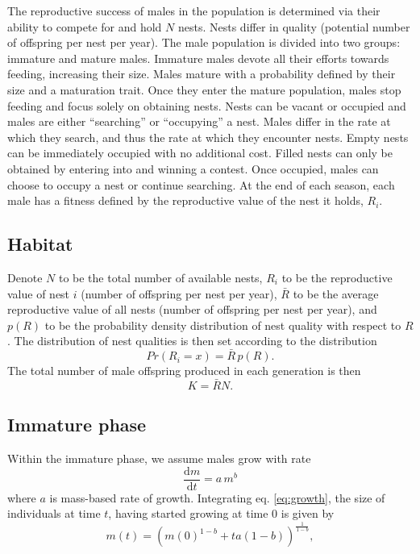 \documentclass[a4paper,11pt]{article}
\begin{document}
The reproductive success of males in the population is determined via their ability to compete for and hold $N$ nests. Nests differ in quality (potential number of offspring per nest per year). The male population is divided into two groups: immature and mature males. Immature males devote all their efforts towards feeding, increasing their size. Males mature with a probability defined by their size and a maturation trait. Once they enter the mature population, males stop feeding and focus solely on obtaining nests. Nests can be vacant or occupied and males are either ``searching'' or ``occupying'' a nest. Males differ in the rate at which they search, and thus the rate at which they encounter nests. Empty nests can be immediately occupied with no additional cost. Filled nests can only be obtained by entering into and winning a contest. Once occupied, males can choose to occupy a nest or continue searching. At the end of each season, each male has a fitness defined by the reproductive value of the nest it holds, $R_i$.

\subsection{Habitat}

Denote $N$ to be the total number of available nests, $R_i$ to be the reproductive value of nest $i$ (number of offspring per nest per year), $\bar{R}$ to be the average reproductive value of all nests (number of offspring per nest per year), and $p(R)$ to be the probability density distribution of nest quality with respect to $R$. The distribution of nest qualities is then set according to the distribution
\begin{equation} \label{eq:pdf_R}
    Pr(R_i = x) =\bar{R} \, p(R).
\end{equation}
The total number of male offspring produced in each generation is then
\begin{equation} \label{eq:pdf_R}
    K = \bar{R} N.
\end{equation}

\subsection{Immature phase}

Within the immature phase, we assume males grow with rate
\begin{equation} \label{eq:growth}
\frac{{\mathrm d} m}{{\mathrm d} t} = a \, m^ b
\end{equation}
where $a$ is mass-based rate of growth. Integrating eq. \ref{eq:growth}, the size of individuals at time $t$, having started growing at time $0$ is given by
\begin{equation} \label{eq:growth}
m(t) = \left(m(0)^{1-b} + t a(1-b)\right)^{\frac1{1-b}},
\end{equation}
\end{document}
